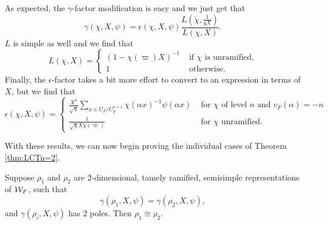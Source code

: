 As expected, the $\gamma$-factor modification is easy and we just get that \[\gamma(\chi, X, \psi) = \epsilon(\chi, X, \psi) \frac{L(\check{\chi}, \frac{1}{qX})}{L(\chi, X)}.\]
$L$ is simple as well and we find that 
\[L(\chi, X) = \begin{cases} (1 - \chi(\varpi) X)^{-1} & \text{ if } \chi \text{ is unramified,} \\ 1 & \text{ otherwise.} \end{cases}\]
Finally, the $\epsilon$-factor takes a bit more effort to convert to an expression in terms of $X$, but we find that
\[\displaystyle\epsilon(\chi, X, \psi) = \begin{cases} \frac{X^n}{\sqrt{q}} \sum_{x \in U_F/U_F^{n+1}} \chi(\alpha x)^{-1} \psi(\alpha x) & \text{ for } \chi \text{ of level } n \text{ and } v_F(\alpha) = -n \\ \frac{1}{\sqrt{q}X\chi(\varpi)} & \text{ for } \chi \text{ unramified.}\end{cases}\]



With these results, we can now begin proving the individual cases of Theorem \ref{thm:LCTn=2}.

\begin{lemma}
  \label{lem:gamma-two-poles}
  Suppose $\rho_1$ and $\rho_2$ are $2$-dimensional, tamely ramified, semisimple representations of $\mathcal{W}_F$, such that
  \[\gamma(\rho_1,X,\psi) = \gamma(\rho_2,X,\psi),\]
  and $\gamma(\rho_i,X,\psi)$ has $2$ poles.
  Then $\rho_1 \cong \rho_2$.
\end{lemma}

